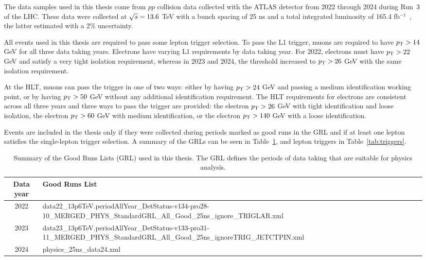 The data samples used in this thesis come from $pp$ collision data collected with the ATLAS detector from 2022 through 2024 during Run~3 of the LHC\@. These data were collected at $\sqrt{s}{} = 13.6$ TeV with a bunch spacing of 25 ns and a total integrated luminosity of 165.4 fb$^{-1}$~\cite{atlas_lumi_image}, the latter estimated with a 2\% uncertainty.

All events used in this thesis are required to pass some lepton trigger selection. To pass the L1 trigger, muons are required to have $p_{\mathrm{T}} > 14$ GeV for all three data taking years. Electrons have varying L1 requirements by data taking year. For 2022, electrons must have $p_{\mathrm{T}} > 22$ GeV and satisfy a very tight isolation requirement, whereas in 2023 and 2024, the threshold increased to $p_{\mathrm{T}} > 26$ GeV with the same isolation requirement.

At the HLT, muons can pass the trigger in one of two ways: either by having $p_{\mathrm{T}} > 24$ GeV and passing a medium identification working point, or by having $p_{\mathrm{T}} > 50$ GeV without any additional identification requirement. The HLT requirements for electrons are consistent across all three years and three ways to pass the trigger are provided: the electron $p_{\mathrm{T}} > 26$ GeV with tight identification and loose isolation, the electron $p_{\mathrm{T}} > 60$ GeV with medium identification, or the electron $p_{\mathrm{T}} > 140$ GeV with a loose identification.

Events are included in the thesis only if they were collected during periods marked as good runs in the GRL and if at least one lepton satisfies the single-lepton trigger selection. A summary of the GRLs can be seen in Table~\ref{tab:grl}, and lepton triggers in Table~\ref{tab:triggers}.

\begin{table}
  \centering
  \begin{tabularx}{1.12\textwidth}{c|>{\centering\arraybackslash}X}
    \hline
    \textbf{Data year} & \textbf{Good Runs List} \\
    \hline
    2022 & data22\_13p6TeV.periodAllYear\_DetStatus-v134-pro28-10\_MERGED\_PHYS\_StandardGRL\_All\_Good\_25ns\_ignore\_TRIGLAR.xml \\ 
    \hline
    2023 & data23\_13p6TeV.periodAllYear\_DetStatus-v133-pro31-11\_MERGED\_PHYS\_StandardGRL\_All\_Good\_25ns\_ignoreTRIG\_JETCTPIN.xml \\
    \hline
    2024 & physics\_25ns\_data24.xml \\
    \hline
  \end{tabularx}
  \caption{Summary of the Good Runs Lists (GRL) used in this thesis. The GRL defines the periods of data taking that are suitable for physics analysis.}\label{tab:grl}
\end{table}

